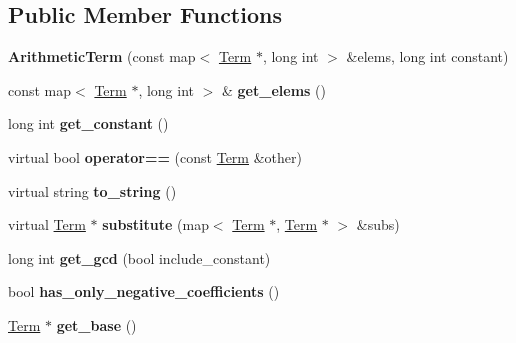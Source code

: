 \subsection*{\-Public \-Member \-Functions}
\begin{DoxyCompactItemize}
\item 
\hypertarget{classArithmeticTerm_a5933b07779ee448e5f932cfd2b3311ac}{{\bfseries \-Arithmetic\-Term} (const map$<$ \hyperlink{classTerm}{\-Term} $\ast$, long int $>$ \&elems, long int constant)}\label{classArithmeticTerm_a5933b07779ee448e5f932cfd2b3311ac}

\item 
\hypertarget{classArithmeticTerm_add8d90212c068e9feeabde87784f51a5}{const map$<$ \hyperlink{classTerm}{\-Term} $\ast$, long int $>$ \& {\bfseries get\-\_\-elems} ()}\label{classArithmeticTerm_add8d90212c068e9feeabde87784f51a5}

\item 
\hypertarget{classArithmeticTerm_a6c106c116d532bc5b7205696c2c7fc0a}{long int {\bfseries get\-\_\-constant} ()}\label{classArithmeticTerm_a6c106c116d532bc5b7205696c2c7fc0a}

\item 
\hypertarget{classArithmeticTerm_afb75e8dc6b4c4e5c093a48fefc9609c9}{virtual bool {\bfseries operator==} (const \hyperlink{classTerm}{\-Term} \&other)}\label{classArithmeticTerm_afb75e8dc6b4c4e5c093a48fefc9609c9}

\item 
\hypertarget{classArithmeticTerm_a56aa9d6e1a1d6a53a16206d8108695e7}{virtual string {\bfseries to\-\_\-string} ()}\label{classArithmeticTerm_a56aa9d6e1a1d6a53a16206d8108695e7}

\item 
\hypertarget{classArithmeticTerm_a8fdd4308c8e547d1f2ba827f04118190}{virtual \hyperlink{classTerm}{\-Term} $\ast$ {\bfseries substitute} (map$<$ \hyperlink{classTerm}{\-Term} $\ast$, \hyperlink{classTerm}{\-Term} $\ast$ $>$ \&subs)}\label{classArithmeticTerm_a8fdd4308c8e547d1f2ba827f04118190}

\item 
\hypertarget{classArithmeticTerm_ac629594b26985cae31a410b0c271dc25}{long int {\bfseries get\-\_\-gcd} (bool include\-\_\-constant)}\label{classArithmeticTerm_ac629594b26985cae31a410b0c271dc25}

\item 
\hypertarget{classArithmeticTerm_a1b1f59a52e5504ee2a0d5d7aec44199f}{bool {\bfseries has\-\_\-only\-\_\-negative\-\_\-coefficients} ()}\label{classArithmeticTerm_a1b1f59a52e5504ee2a0d5d7aec44199f}

\item 
\hypertarget{classArithmeticTerm_ae4d804551f45cbc75b2f66fa02b60067}{\hyperlink{classTerm}{\-Term} $\ast$ {\bfseries get\-\_\-base} ()}\label{classArithmeticTerm_ae4d804551f45cbc75b2f66fa02b60067}

\end{DoxyCompactItemize}
